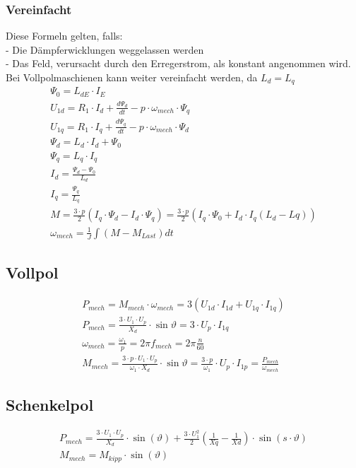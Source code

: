 \subsubsection{Vereinfacht}
Diese Formeln gelten, falls:\\
- Die Dämpferwicklungen weggelassen werden\\
- Das Feld, verursacht durch den Erregerstrom, als konstant angenommen wird.\\
Bei Vollpolmaschienen kann weiter vereinfacht werden, da $L_d = L_q$
{\setlength{\jot}{4pt}
\begin{gather*}
\Psi_0 = L_{dE} \cdot I_E \\
U_{1d} = R_1 \cdot I_d + \frac{d\Psi_d}{dt} - p \cdot \omega_{mech} \cdot \Psi_q \\
U_{1q} = R_1 \cdot I_q + \frac{d\Psi_q}{dt} - p \cdot \omega_{mech} \cdot \Psi_d \\
\Psi_d = L_d \cdot I_d + \Psi_0 \\
\Psi_q = L_q \cdot I_q \\
I_d = \frac{\Psi_d - \Psi_0}{L_d} \\
I_q = \frac{\Psi_q}{L_q} \\
M = \frac{3 \cdot p}{2}(I_q \cdot \Psi_d - I_d \cdot \Psi_q) = \frac{3 \cdot p}{2}(I_q \cdot \Psi_0 + I_d \cdot I_q(L_d - Lq)) \\
\omega_{mech} = \frac{1}{J} \int (M - M_{Last}) dt
\end{gather*}}

\subsection{Vollpol}
\begin{gather*}
P_{mech} = M_{mech} \cdot \omega_{mech} = 3(U_{1d} \cdot I_{1d} + U_{1q} \cdot I_{1q}) \\
P_{mech} = \frac{3 \cdot U_1 \cdot U_p}{X_d} \cdot \sin\vartheta = 3 \cdot U_p \cdot I_{1q} \\
\omega_{mech} = \frac{\omega_1}{p} = 2\pi f_{mech} = 2\pi \frac{n}{60} \\
M_{mech} = \frac{3 \cdot p \cdot U_1 \cdot U_p}{\omega_1 \cdot X_d} \cdot \sin\vartheta = \frac{3 \cdot p}{\omega_1} \cdot U_p \cdot I_{1p} = \frac{P_{mech}}{\omega_{mech}}
\end{gather*}

\subsection{Schenkelpol}
\begin{gather*}
P_{mech} = \frac{3 \cdot U_1 \cdot U_p}{X_d} \cdot \sin(\vartheta) + \frac{3 \cdot U_1^2}{2}\left(\frac{1}{Xq} - \frac{1}{Xd}\right) \cdot \sin(s \cdot \vartheta) %
\\
M_{mech} = M_{kipp} \cdot \sin(\vartheta)
\end{gather*}
